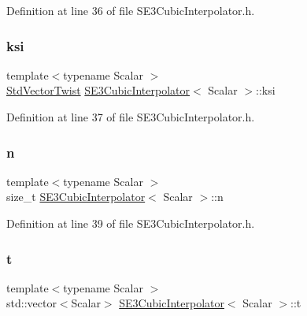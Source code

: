 Definition at line 36 of file S\+E3\+Cubic\+Interpolator.\+h.

\hypertarget{class_s_e3_cubic_interpolator_ab1e8c4aa3aaef4fee220e7ef50f493c1}{}\label{class_s_e3_cubic_interpolator_ab1e8c4aa3aaef4fee220e7ef50f493c1} 
\subsubsection{\texorpdfstring{ksi}{ksi}}
{\footnotesize\ttfamily template$<$typename Scalar $>$ \\
\hyperlink{class_s_e3_cubic_interpolator_ae70acde9b57ec38aaf1eaeee50bb35c5}{Std\+Vector\+Twist} \hyperlink{class_s_e3_cubic_interpolator}{S\+E3\+Cubic\+Interpolator}$<$ Scalar $>$\+::ksi\hspace{0.3cm}{\ttfamily [protected]}}



Definition at line 37 of file S\+E3\+Cubic\+Interpolator.\+h.

\hypertarget{class_s_e3_cubic_interpolator_a9294008dfdce440c453807ff4f6fee23}{}\label{class_s_e3_cubic_interpolator_a9294008dfdce440c453807ff4f6fee23} 
\subsubsection{\texorpdfstring{n}{n}}
{\footnotesize\ttfamily template$<$typename Scalar $>$ \\
size\+\_\+t \hyperlink{class_s_e3_cubic_interpolator}{S\+E3\+Cubic\+Interpolator}$<$ Scalar $>$\+::n\hspace{0.3cm}{\ttfamily [protected]}}



Definition at line 39 of file S\+E3\+Cubic\+Interpolator.\+h.

\hypertarget{class_s_e3_cubic_interpolator_ad8083c34a619f3cb55f35ccaffeb6154}{}\label{class_s_e3_cubic_interpolator_ad8083c34a619f3cb55f35ccaffeb6154} 
\subsubsection{\texorpdfstring{t}{t}}
{\footnotesize\ttfamily template$<$typename Scalar $>$ \\
std\+::vector$<$Scalar$>$ \hyperlink{class_s_e3_cubic_interpolator}{S\+E3\+Cubic\+Interpolator}$<$ Scalar $>$\+::t\hspace{0.3cm}{\ttfamily [protected]}}



